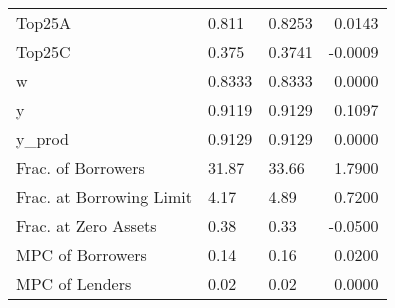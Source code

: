 \begin{table}
\begin{tabular}{lllr}
                  Top25A &   0.811 &   0.8253 &  0.0143 \\
                  Top25C &   0.375 &   0.3741 & -0.0009 \\
                       w &  0.8333 &   0.8333 &  0.0000 \\
                       y &  0.9119 &   0.9129 &  0.1097 \\
                  y\_prod &  0.9129 &   0.9129 &  0.0000 \\
      Frac. of Borrowers &   31.87 &    33.66 &  1.7900 \\
Frac. at Borrowing Limit &    4.17 &     4.89 &  0.7200 \\
    Frac. at Zero Assets &    0.38 &     0.33 & -0.0500 \\
        MPC of Borrowers &    0.14 &     0.16 &  0.0200 \\
          MPC of Lenders &    0.02 &     0.02 &  0.0000 \\
\bottomrule
\end{tabular}
\end{table}
